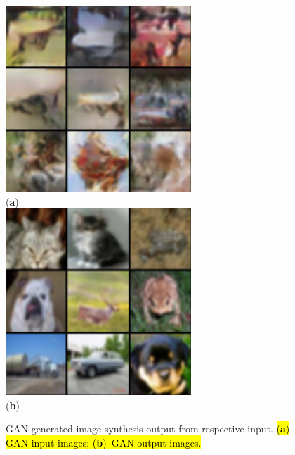 \documentclass[technologies,article,accept,pdftex,moreauthors]{Definitions/mdpi}
\begin{document}
\begin{figure}[H]
\includegraphics[width=.77\linewidth]{ganin.png}\\
\text{~~~~~~~~~~~~~~~~~~~~~~~~~~~~~~~~~~~~~~~~~~~~~~~~~~~~~~~~}(\textbf{a}) 
        \label{fig:ganin} \\
        \includegraphics[width=.77\linewidth]{ganout.png}\\
\text{~~~~~~~~~~~~~~~~~~~~~~~~~~~~~~~~~~~~~~~~~~~~~~~~~~~~~~~~}(\textbf{b}) 
        \label{fig:ganout} 
    \caption{GAN-generated image synthesis output from respective input. \hl{(\textbf{a}) GAN input images; (\textbf{b})~GAN output images.}} %
    \label{fig:ganresults}
\end{figure}
\end{document}
